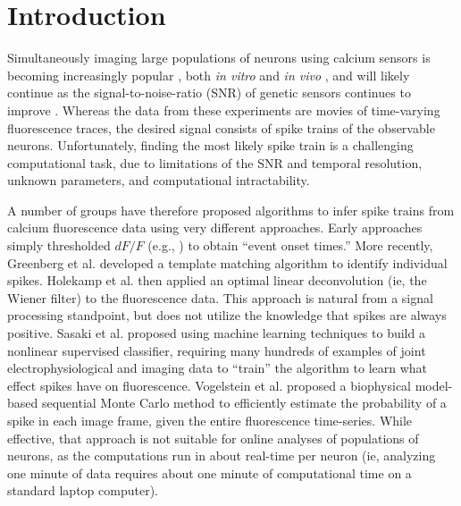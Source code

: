\section{Introduction}


Simultaneously imaging large populations of neurons using calcium sensors is becoming increasingly popular \cite{ImagingManual}, both \emph{in vitro} \cite{SmettersYuste99, IkegayaYuste04} and \emph{in vivo} \cite{NagayamaChen07, GobelHelmchen07, LuoSvoboda08}, and will likely continue as the signal-to-noise-ratio (SNR) of genetic sensors continues to improve \cite{GaraschukKonnerth07, MankGriesbeck08b, WallaceHasan08}. 
Whereas the data from these experiments are movies of time-varying fluorescence traces, the desired signal consists of spike trains of the observable neurons. Unfortunately, finding the most likely spike train is a challenging computational task, due to limitations of the SNR and temporal resolution, unknown parameters, and computational intractability. %

A number of groups have therefore proposed algorithms to infer spike trains from calcium fluorescence data using very different approaches.  Early approaches simply thresholded $dF/F$ (e.g., \cite{Schwartz98,Mao01}) to obtain ``event onset times.''  More recently, Greenberg et al. \cite{GreenbergKerr08} developed a  template matching algorithm to identify individual spikes. %
Holekamp et al. \cite{HolekampHoly08} then applied an optimal linear deconvolution (ie, the Wiener filter) to the fluorescence data.  This approach is natural from a signal processing standpoint, but does not utilize the knowledge that spikes are always positive.  Sasaki et al. \cite{SasakiIkegaya08} proposed using machine learning techniques to build a nonlinear supervised classifier, requiring many hundreds of examples of joint electrophysiological and imaging data to ``train'' the algorithm to learn what effect spikes have on fluorescence.  Vogelstein et al. \cite{VogelsteinPaninski09} proposed a biophysical model-based sequential Monte Carlo method to efficiently estimate the probability of a spike in each image frame, given the entire fluorescence time-series.  While effective, that approach is not suitable for online analyses of populations of neurons, as the computations run in about real-time per neuron (ie, analyzing one minute of data requires about one minute of computational time on a standard laptop computer).

